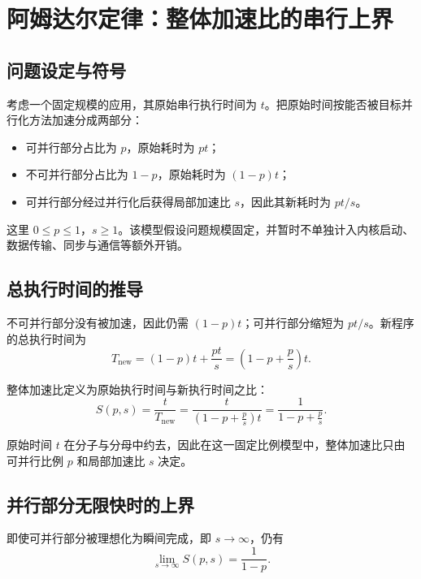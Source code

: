 \section{阿姆达尔定律：整体加速比的串行上界}
\label{l1:sec:amdahl}

\subsection{问题设定与符号}

考虑一个固定规模的应用，其原始串行执行时间为 $t$。把原始时间按能否被目标并行化方法加速分成两部分：
\begin{itemize}
  \item 可并行部分占比为 $p$，原始耗时为 $pt$；
  \item 不可并行部分占比为 $1-p$，原始耗时为 $(1-p)t$；
  \item 可并行部分经过并行化后获得局部加速比 $s$，因此其新耗时为 $pt/s$。
\end{itemize}

这里 $0\le p\le 1$，$s\ge 1$。该模型假设问题规模固定，并暂时不单独计入内核启动、数据传输、同步与通信等额外开销。

\subsection{总执行时间的推导}

不可并行部分没有被加速，因此仍需 $(1-p)t$；可并行部分缩短为 $pt/s$。新程序的总执行时间为
\begin{equation}
  T_{\mathrm{new}}
  =(1-p)t+\frac{pt}{s}
  =\left(1-p+\frac{p}{s}\right)t.
  \label{l1:eq:amdahl-time}
\end{equation}

整体加速比定义为原始执行时间与新执行时间之比：
\begin{equation}
  S(p,s)
  =\frac{t}{T_{\mathrm{new}}}
  =\frac{t}{\left(1-p+\frac{p}{s}\right)t}
  =\boxed{\frac{1}{1-p+\frac{p}{s}}}.
  \label{l1:eq:amdahl-speedup}
\end{equation}

原始时间 $t$ 在分子与分母中约去，因此在这一固定比例模型中，整体加速比只由可并行比例 $p$ 和局部加速比 $s$ 决定。

\subsection{并行部分无限快时的上界}

即使可并行部分被理想化为瞬间完成，即 $s\to\infty$，仍有
\begin{equation}
  \lim_{s\to\infty}S(p,s)
  =\frac{1}{1-p}.
  \label{l1:eq:amdahl-limit}
\end{equation}


